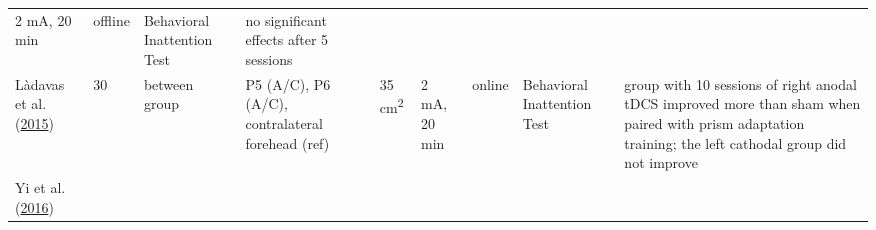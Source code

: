 \documentclass[11pt,]{memoir}
\begin{document}
\begin{longtable}[]{@{}lllllllll@{}}
\begin{minipage}[t]{0.05\columnwidth}
2 mA, 20
min\strut
\end{minipage} & \begin{minipage}[t]{0.04\columnwidth}\raggedright
offline\strut
\end{minipage} & \begin{minipage}[t]{0.15\columnwidth}\raggedright
Behavioral Inattention Test\strut
\end{minipage} & \begin{minipage}[t]{0.24\columnwidth}\raggedright
no significant effects after 5 sessions\strut
\end{minipage}\tabularnewline
\begin{minipage}[t]{0.09\columnwidth}\raggedright
Làdavas et al. (\protect\hyperlink{ref-Ladavas2015}{2015})\strut
\end{minipage} & \begin{minipage}[t]{0.02\columnwidth}\raggedright
30\strut
\end{minipage} & \begin{minipage}[t]{0.04\columnwidth}\raggedright
between
group\strut
\end{minipage} & \begin{minipage}[t]{0.10\columnwidth}\raggedright
P5 (A/C), P6 (A/C),
contralateral forehead
(ref)\strut
\end{minipage} & \begin{minipage}[t]{0.03\columnwidth}\raggedright
35
cm\textsuperscript{2}\strut
\end{minipage} & \begin{minipage}[t]{0.05\columnwidth}\raggedright
2 mA, 20
min\strut
\end{minipage} & \begin{minipage}[t]{0.04\columnwidth}\raggedright
online\strut
\end{minipage} & \begin{minipage}[t]{0.15\columnwidth}\raggedright
Behavioral Inattention Test\strut
\end{minipage} & \begin{minipage}[t]{0.24\columnwidth}\raggedright
group with 10 sessions of right anodal tDCS improved more
than sham when paired with prism adaptation training; the
left cathodal group did not improve\strut
\end{minipage}\tabularnewline
\begin{minipage}[t]{0.09\columnwidth}\raggedright
Yi et al. (\protect\hyperlink{ref-Yi2016}{2016})\strut
\end{minipage} & \begin{minipage}[t]{0.02\columnwidth}\raggedright

\end{minipage}
\end{longtable}
\end{document}
